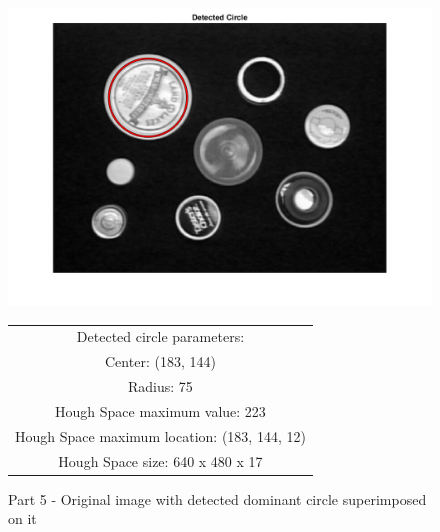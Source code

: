 \documentclass[12pt]{article}
\begin{document}
\begin{figure}
	\centering
	\includegraphics[width=0.7\linewidth]{detected_circle}
	\caption{Part 5 - Original image with detected dominant circle superimposed on it}
	\label{fig:detectedcircle}
	
	\begin{tabular}{|c|}
		\hline
		\\
		\hline
		Detected circle parameters: \\
		\hline
		Center: (183, 144) \\
		\hline
		Radius: 75 \\
		\hline
		Hough Space maximum value: 223 \\
		\hline
		Hough Space maximum location: (183, 144, 12) \\
		\hline
		Hough Space size: 640 x 480 x 17 \\
		\hline
	\end{tabular}
	
\end{figure}
\end{document}
